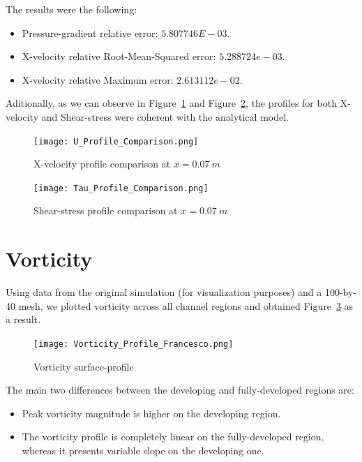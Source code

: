 \documentclass[12pt]{article}
\begin{document}
        The results were the following:

        \begin{itemize}
                \item Pressure-gradient relative error: \( 5.807746E-03 \).
                \item X-velocity relative Root-Mean-Squared error: \( 5.288724e-03 \).
                \item X-velocity relative Maximum error: \( 2.613112e-02 \).
        \end{itemize}

        Aditionally, as we can observe in Figure~\ref{fig:u_comparison} and Figure~\ref{fig:tau_comparison}, the profiles for both X-velocity and Shear-stress were coherent with the analytical model.

        \begin{figure}[!ht]
                \texttt{[image: U\_Profile\_Comparison.png]}
                \centering
                \caption{X-velocity profile comparison at \(x = 0.07 \: m \)}
                \label{fig:u_comparison}
        \end{figure}

        \begin{figure}[!ht]
                \texttt{[image: Tau\_Profile\_Comparison.png]}
                \centering
                \caption{Shear-stress profile comparison at \(x = 0.07 \: m \)}
                \label{fig:tau_comparison}
        \end{figure}

\section{Vorticity} \label{sec:vorticity}

        Using data from the original simulation (for visualization purposes) and a 100-by-40 mesh, we plotted vorticity across all channel regions and obtained Figure~\ref{fig:vorticity} as a result.

        \begin{figure}[!ht]
                \texttt{[image: Vorticity\_Profile\_Francesco.png]}
                \centering
                \caption{Vorticity surface-profile}
                \label{fig:vorticity}
        \end{figure}

        The main two differences between the developing and fully-developed regions are:

        \begin{itemize}
                \item Peak vorticity magnitude is higher on the developing region.
                \item The vorticity profile is completely linear on the fully-developed region, whereas it presents variable slope on the developing one.
        \end{itemize}



\end{document}
